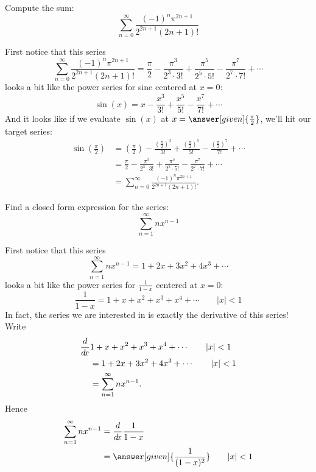 \documentclass{ximera}
\begin{document}
\begin{example}
  Compute the sum:
  \[
  \sum_{n=0}^\infty \frac{(-1)^n \pi^{2n+1}}{2^{2n+1}(2n+1)!}
  \]
  \begin{explanation}
    First notice that this series
    \[
    \sum_{n=0}^\infty \frac{(-1)^n \pi^{2n+1}}{2^{2n+1}(2n+1)!} = \frac{\pi}{2} - \frac{\pi^3}{2^3\cdot 3!}+ \frac{\pi^5}{2^5\cdot 5!} - \frac{\pi^7}{2^7\cdot 7!} + \cdots
    \]
    looks a bit like the power series for sine centered at $x=0$:
    \[
    \sin(x) = x-\frac{x^3}{3!} + \frac{x^5}{5!} - \frac{x^7}{7!}+ \cdots
    \]
    And it looks like if we evaluate $\sin(x)$ at $x =
    \answer[given]{\frac{\pi}{2}}$, we'll hit our target series:
    \begin{align*}
      \sin\left(\frac{\pi}{2}\right) &=\left(\frac{\pi}{2}\right)-\frac{\left(\frac{\pi}{2}\right)^3}{3!} + \frac{\left(\frac{\pi}{2}\right)^5}{5!} - \frac{\left(\frac{\pi}{2}\right)^7}{7!}+ \cdots\\
      &= \frac{\pi}{2} - \frac{\pi^3}{2^3\cdot 3!}+ \frac{\pi^5}{2^5\cdot 5!} - \frac{\pi^7}{2^7\cdot 7!} + \cdots\\
      &=\sum_{n=0}^\infty \frac{(-1)^n \pi^{2n+1}}{2^{2n+1}(2n+1)!}.
    \end{align*}
  \end{explanation}
\end{example}



\begin{example}
  Find a closed form expression for the series:
  \[
  \sum_{n=1}^\infty nx^{n-1}
  \]
  \begin{explanation}
    First notice that this series
    \[
    \sum_{n=1}^\infty nx^{n-1} = 1 + 2x + 3x^2 + 4x^3 + \cdots
    \]
    looks a bit like the power series for $\frac{1}{1-x}$  centered at $x=0$:
    \[
    \frac{1}{1-x} = 1+ x+x^2 + x^3+x^4+\cdots\qquad |x|<1
    \]
    In fact, the series we are interested in is exactly the derivative of this series! Write
    \begin{align*}
    \frac{d}{\mathop{}\!d\! x} &1+ x+x^2 + x^3+x^4+\cdots\qquad |x|<1\\
    &=1 + 2x + 3x^2 + 4x^3 + \cdots\qquad |x|<1\\
    &=\sum_{n=1}^\infty nx^{n-1}.
    \end{align*}
    Hence
    \begin{align*}
    \sum_{n=1}^\infty nx^{n-1} &= \ddx \frac{1}{1-x}\\
    &=\answer[given]{\frac{1}{(1-x)^2}}\qquad |x|<1
    \end{align*}
  \end{explanation}
\end{example}
\end{document}
